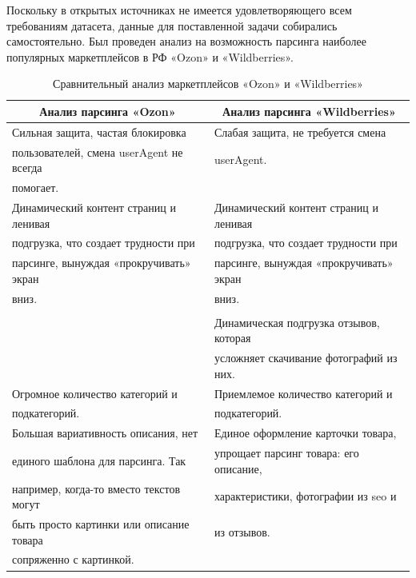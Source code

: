 \documentclass[a4paper,12pt]{extarticle}
\begin{document}
Поскольку в открытых источниках не имеется удовлетворяющего всем требованиям датасета, данные для поставленной задачи собирались самостоятельно. Был проведен анализ на возможность парсинга наиболее популярных маркетплейсов в РФ «Ozon» и «Wildberries».

\begin{table}[h]
	\centering
	\begin{tabular}{ |l|l| }
		\toprule
		\multicolumn{1}{c}{\textbf{Анализ парсинга «Ozon»}} & \multicolumn{1}{c}{\textbf{Анализ парсинга «Wildberries»} } \\
		\midrule		 
		Сильная защита, частая блокировка  &  Слабая защита, не требуется смена  \\
		пользователей, смена userAgent не всегда  & userAgent. \\
		помогает. & \\ \hline
		Динамический контент страниц и ленивая & Динамический контент страниц и ленивая\\ 
		подгрузка, что создает трудности при & подгрузка, что создает трудности при\\ 	
		парсинге, вынуждая «прокручивать» экран & парсинге, вынуждая «прокручивать» экран \\
		вниз. & вниз.\\
		 &  \\
		 & Динамическая подгрузка отзывов, которая\\
		 & усложняет скачивание фотографий из них.\\ \hline		
		Огромное количество категорий и & Приемлемое количество категорий и\\
		подкатегорий. & подкатегорий. \\ \hline
		Большая вариативность описания, нет & Единое оформление карточки товара,\\
		единого шаблона для парсинга. Так & упрощает парсинг товара: его описание,\\
		например, когда-то вместо текстов могут & характеристики, фотографии из seo и\\
		быть просто картинки или описание товара & из отзывов. \\
		сопряженно с картинкой. & \\ \hline 
	\end{tabular}
	\caption{Сравнительный анализ маркетплейсов «Ozon» и «Wildberries»}
	\label{table:marketplace_analysis}
\end{table}
\end{document}
